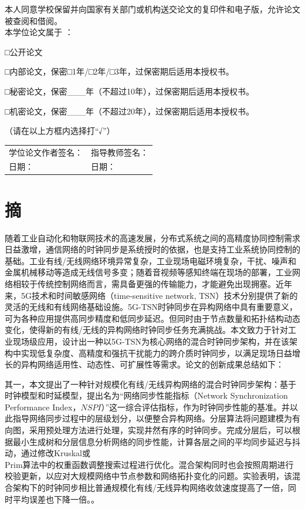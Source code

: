 \documentclass[UTF8,a4paper,12pt]{ctexart}
\numberwithin{equation}{section}
\begin{document}
本人同意学校保留并向国家有关部门或机构送交论文的复印件和电子版，允许论文被查阅和借阅。\\
本学位论文属于 ：\par
□公开论文\par
□内部论文，保密□1年/□2年/□3年，过保密期后适用本授权书。\par
□秘密论文，保密\_\_\_年（不超过10年），过保密期后适用本授权书。\par
□机密论文，保密\_\_\_年（不超过20年），过保密期后适用本授权书。\par
（请在以上方框内选择打“√”）\\

\begin{flushright}
\begin{tabular}{l l}
学位论文作者签名：\hspace{10mm}\qquad \hspace{100mm}&指导教师签名：\qquad\\
日期： &日期：\\
\end{tabular}
\end{flushright}

\newpage
{}

\section*{摘}


随着工业自动化和物联网技术的高速发展，分布式系统之间的高精度协同控制需求日益激增，通信网络的时钟同步是系统授时的依据，也是支持工业系统协同控制的基础。工业有线/无线网络环境异常复杂，工业现场电磁环境复杂，干扰、噪声和金属机械移动等造成无线信号多变；随着音视频等感知终端在现场的部署，工业网络相较于传统控制网络而言，需具备更强的传输能力，才能避免出现拥塞。近年来，5G技术和时间敏感网络（time-sensitive network, TSN）技术分别提供了新的灵活的无线和有线网络基础设施。5G-TSN时钟同步在异构网络中具有重要意义，可为各种应用提供高同步精度和低同步延迟。但同时由于节点数量和拓扑结构动态变化，使得新的有线/无线的异构网络时钟同步任务充满挑战。本文致力于针对工业现场级应用，设计出一种以5G-TSN为核心网络的混合时钟同步架构，并在该架构中实现低复杂度、高精度和强抗干扰能力的跨介质时钟同步，以满足现场日益增长的异构网络适用性、动态性、可扩展性等需求。论文的创新成果总结如下：

其一，本文提出了一种针对规模化有线/无线异构网络的混合时钟同步架构：基于时钟模型和时延模型，提出名为“网络同步性能指标（Network Synchronization Performance Index，$NSPI$）”这一综合评估指标，作为时钟同步性能的基准。并以此指导网络同步过程中的层级划分，以便整合异构网络。分层算法将问题建模为有向图，采用预处理方法进行处理，实现井然有序的时钟同步。完成分层后，可以根据最小生成树和分层信息分析网络的同步性能，计算各层之间的平均同步延迟与抖动，通过修改Kruskal或\\Prim算法中的权重函数调整搜索过程进行优化。混合架构同时也会按照周期进行校验更新，以应对大规模网络中节点参数和网络拓扑变化的问题。实验表明，该混合架构下的时钟同步相比普通规模化有线/无线异构网络收敛速度提高了一倍，同时平均误差也下降一倍。。
\end{document}
